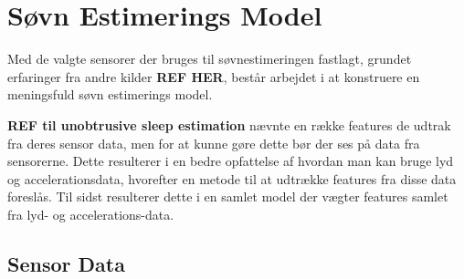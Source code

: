 \section{Søvn Estimerings Model}
Med de valgte sensorer der bruges til søvnestimeringen fastlagt, grundet erfaringer fra andre kilder \textbf{REF HER}, består arbejdet i at konstruere en meningsfuld søvn estimerings model.

\textbf{REF til unobtrusive sleep estimation} nævnte en række features de udtrak fra deres sensor data, men for at kunne gøre dette bør der ses på data fra sensorerne.
Dette resulterer i en bedre opfattelse af hvordan man kan bruge lyd og accelerationsdata, hvorefter en metode til at udtrække features fra disse data foreslås.
Til sidst resulterer dette i en samlet model der vægter features samlet fra lyd- og accelerations-data.

\subsection{Sensor Data}
